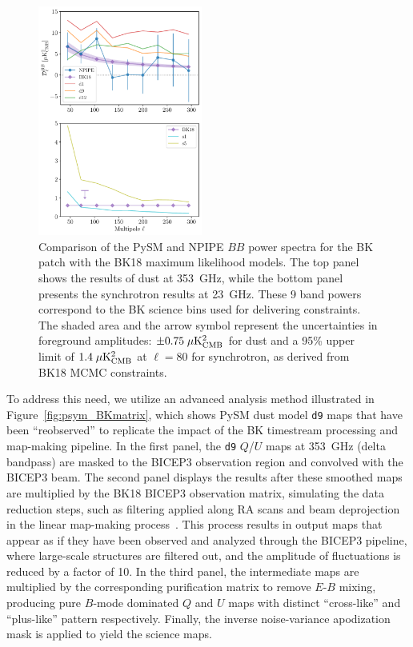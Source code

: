 \documentclass[twocolumn]{aastex631}
\begin{document}
\begin{figure}
    \centering
    \includegraphics[width=0.48\textwidth]{figures/BKfield_power.pdf}
    \caption{Comparison of the PySM and NPIPE $BB$ power spectra for the BK patch with the BK18 maximum likelihood models. The top panel shows the results of dust at 353~GHz, while the bottom panel presents the synchrotron results at 23~GHz. These 9 band powers correspond to the BK science bins used for delivering constraints. The shaded area and the arrow symbol represent the uncertainties in foreground amplitudes: $\pm 0.75 \; \mu\rm{K^2_{CMB}}$ for dust and a 95\% upper limit of $1.4 \; \mu\rm{K^2_{CMB}}$ at $\ell = 80$ for synchrotron, as derived from BK18 MCMC constraints.}
    \label{fig:BKfield_power}
\end{figure}

To address this need, we utilize an advanced analysis method illustrated in Figure~\ref{fig:psym_BKmatrix}, which shows PySM dust model \texttt{d9} maps that have been ``reobserved'' to replicate the impact of the BK timestream processing and map-making pipeline. In the first panel, the \texttt{d9} $Q$/$U$ maps at 353~GHz (delta bandpass) are masked to the BICEP3 observation region and convolved with the BICEP3 beam. The second panel displays the results after these smoothed maps are multiplied by the BK18 BICEP3 observation matrix, simulating the data reduction steps, such as filtering applied along RA scans and beam deprojection in the linear map-making process~\cite{BICEP2Collaboration:2016}. This process results in output maps that appear as if they have been observed and analyzed through the BICEP3 pipeline, where large-scale structures are filtered out, and the amplitude of fluctuations is reduced by a factor of 10. In the third panel, the intermediate maps are multiplied by the corresponding purification matrix to remove $E$-$B$ mixing, producing pure $B$-mode dominated $Q$ and $U$ maps with distinct ``cross-like'' and ``plus-like'' pattern respectively. Finally, the inverse noise-variance apodization mask is applied to yield the science maps. 
\end{document}
